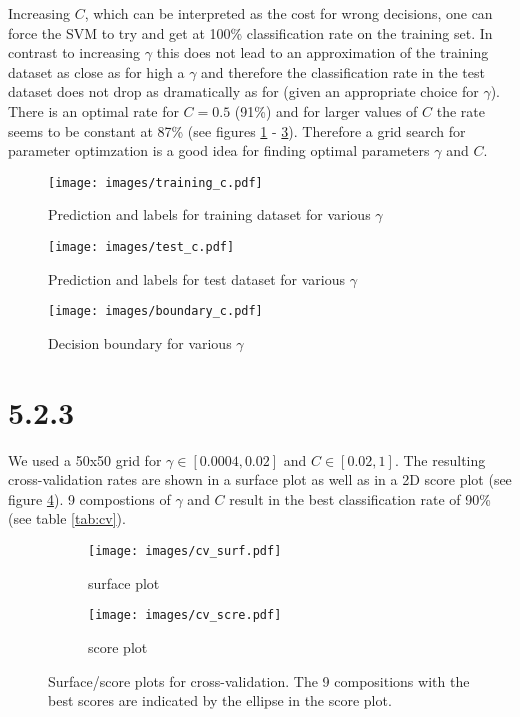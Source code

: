 \documentclass[a4paper,11pt]{article}
\theoremstyle{definition}
\theoremstyle{plain}
\theoremstyle{remark}
\begin{document}
\clearpage
Increasing $C$, which can be interpreted as the cost for wrong decisions, one can force the SVM to try and get at 100\% classification rate on the training set. In contrast to increasing $\gamma$ this does not lead to an approximation of the training dataset as close as for high a $\gamma$ and therefore the classification rate in the test dataset does not drop as dramatically as for (given an appropriate choice for $\gamma$). There is an optimal rate for $C=0.5$ (91\%) and for larger values of $C$ the rate seems to be constant at 87\% (see figures \ref{fig:tr_c} - \ref{fig:bnd_c}). Therefore a grid search for parameter optimzation is a good idea for finding optimal parameters $\gamma$ and $C$.

\begin{figure}[H]
\centering
\texttt{[image: images/training\_c.pdf]}
\caption{Prediction and labels for training dataset for various $\gamma$}
\label{fig:tr_c}
\end{figure}

\begin{figure}[H]
\centering
\texttt{[image: images/test\_c.pdf]}
\caption{Prediction and labels for test dataset for various $\gamma$}
\label{fig:te_c}
\end{figure}

\begin{figure}[H]
\centering
\texttt{[image: images/boundary\_c.pdf]}
\caption{Decision boundary for various $\gamma$}
\label{fig:bnd_c}
\end{figure}

\clearpage
\section*{5.2.3}

We used a 50x50 grid for $\gamma\in [0.0004, 0.02]$ and $C\in [0.02, 1]$. The resulting cross-validation rates are shown in a surface plot as well as in a 2D score plot (see figure \ref{fig:cv}). 9 compostions of $\gamma$ and $C$ result in the best classification rate of 90\% (see table \ref{tab:cv}).

\begin{figure}[H]
\centering
\begin{subfigure}{0.49\textwidth}
\centering
\texttt{[image: images/cv\_surf.pdf]}
\caption{surface plot}
\end{subfigure}
\hfill
\begin{subfigure}{0.49\textwidth}
\centering
\texttt{[image: images/cv\_scre.pdf]}
\caption{score plot}
\end{subfigure}
\caption{Surface/score plots for cross-validation. The 9 compositions with the best scores are indicated by the ellipse in the score plot.}
\label{fig:cv}
\end{figure}
\end{document}
